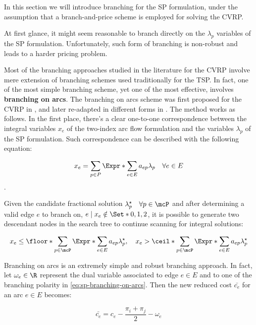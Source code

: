 In this section we will introduce branching for the SP formulation,
under the assumption that a branch-and-price scheme is employed
for solving the CVRP.

At first glance,
it might seem reasonable to branch directly on the $\lambda_p$ variables of the SP formulation.
Unfortunately, such form of branching is non-robust
and leads to a harder pricing problem.

Most of the branching approaches studied in the literature for the CVRP involve
mere extension of branching schemes used traditionally for the TSP.
In fact, one of the most simple branching scheme,
yet one of the most effective,
involves \textbf{branching on arcs}.
The branching on arcs scheme was first proposed for the CVRP in \textcite{christofides1969a},
and later re-adapted in different forms in \textcite{fisher1994a, miller1995}.
The method works as follows.
In the first place,
there's a clear one-to-one correspondence
between the integral variables $x_e$ of the two-index arc flow formulation
and the variables $\lambda_p$ of the SP formulation.
Such correspondence can be described with the following equation:

\begin{equation}
	x_e = \sum_{p \in P} \Expr*{\sum_{e \in E} a_{ep}} \lambda_p  \quad \forall e \in E
\end{equation}.

Given the candidate fractional solution $\lambda^\star_p \quad \forall p \in \mcP$
and after determining a valid edge $e$ to branch on, $e \mid x_e \notin \Set*{0, 1, 2}$,
it is possible to generate two descendant nodes in the search tree
to continue scanning for integral solutions:

\begin{equation}\label{eq:sp-branching-on-arcs}
	x_e \le \floor*{\sum_{p \in \mcP} \Expr*{\sum_{e \in E} a_{ep}} \lambda^\star_p}, \quad
	x_e > \ceil*{\sum_{p \in \mcP} \Expr*{\sum_{e \in E} a_{ep}} \lambda^\star_p}
\end{equation}


Branching on arcs is an extremely simple and robust branching approach.
In fact, let $\omega_e \in \R$ represent the dual variable associated to
edge $e \in E$ and to
one of the branching polarity in \cref{eq:sp-branching-on-arcs}.
Then the new reduced cost $\bar{c_e}$ for an arc $e \in E$ becomes:

\begin{equation}
	\bar{c_e} = c_e - \frac{\pi_i + \pi_j}{2} - \omega_e
\end{equation}

